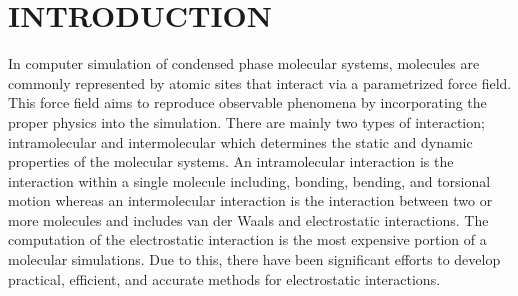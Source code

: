 %
%
%
%
%
%
%
%
%
%
%
%


\chapter{INTRODUCTION}

In computer simulation of condensed phase molecular systems, molecules are commonly represented by atomic sites that interact via a parametrized force field. This force field aims to reproduce observable phenomena by incorporating the proper physics into the simulation. There are mainly two types of interaction; intramolecular and intermolecular which determines the static and dynamic properties of the molecular systems. An intramolecular interaction is the interaction within a single molecule including, bonding, bending, and torsional motion whereas an intermolecular interaction is the interaction between two or more molecules and includes van der Waals and electrostatic interactions. The computation of the electrostatic interaction is the most expensive portion of a molecular simulations. Due to this, there have been significant efforts to develop practical, efficient, and accurate methods for electrostatic interactions. 

